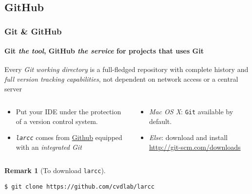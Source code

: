 \documentclass{beamer}
\newtheorem{remark}[theorem]{Remark}
\begin{document}
\subsection{GitHub}
\begin{frame}[fragile]
  \frametitle{Git \& GitHub}
  \framesubtitle{{\bf Git} \emph{the tool}, {\bf GitHub} \emph{the service} for projects that uses Git}

Every \emph{Git working directory} is a full-fledged \alert{repository} with complete history and \emph{full \alert{version tracking} capabilities}, not dependent on network access or a central server

\vfill

\begin{columns}
	\begin{column}{6.5cm}
\begin{itemize}
\item 
Put your IDE under the protection of a \alert{version control system}. 

\item 
\emph{\texttt{larcc}} comes from \href{https://github.com/}{\alert{Github}} equipped with an \emph{integrated Git} 
\end{itemize}
	\end{column}
\pause
	\begin{column}{6cm}
\begin{itemize}
\item 
\emph{Mac OS X}: \alert{\texttt{Git}} available by default.
\item 
\emph{Else}: download and install
\href{http://git-scm.com/downloads}{\alert{http://git-scm.com/downloads}}
\end{itemize}
	\end{column}
\end{columns}

\vfill

\begin{remark}[\alert{To download \texttt{larcc}}]
\begin{verbatim}
$ git clone https://github.com/cvdlab/larcc
\end{verbatim}
\end{remark}

\end{frame}
\end{document}
